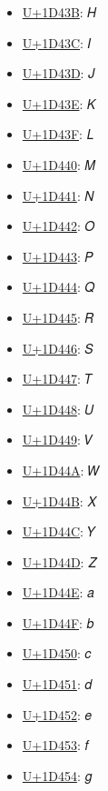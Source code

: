 \begin{itemize}
	\item \href{https://decodeunicode.org/en/u+1D43B}{U+1D43B}: 𝐻
	\item \href{https://decodeunicode.org/en/u+1D43C}{U+1D43C}: 𝐼
	\item \href{https://decodeunicode.org/en/u+1D43D}{U+1D43D}: 𝐽
	\item \href{https://decodeunicode.org/en/u+1D43E}{U+1D43E}: 𝐾
	\item \href{https://decodeunicode.org/en/u+1D43F}{U+1D43F}: 𝐿
	\item \href{https://decodeunicode.org/en/u+1D440}{U+1D440}: 𝑀
	\item \href{https://decodeunicode.org/en/u+1D441}{U+1D441}: 𝑁
	\item \href{https://decodeunicode.org/en/u+1D442}{U+1D442}: 𝑂
	\item \href{https://decodeunicode.org/en/u+1D443}{U+1D443}: 𝑃
	\item \href{https://decodeunicode.org/en/u+1D444}{U+1D444}: 𝑄
	\item \href{https://decodeunicode.org/en/u+1D445}{U+1D445}: 𝑅
	\item \href{https://decodeunicode.org/en/u+1D446}{U+1D446}: 𝑆
	\item \href{https://decodeunicode.org/en/u+1D447}{U+1D447}: 𝑇
	\item \href{https://decodeunicode.org/en/u+1D448}{U+1D448}: 𝑈
	\item \href{https://decodeunicode.org/en/u+1D449}{U+1D449}: 𝑉
	\item \href{https://decodeunicode.org/en/u+1D44A}{U+1D44A}: 𝑊
	\item \href{https://decodeunicode.org/en/u+1D44B}{U+1D44B}: 𝑋
	\item \href{https://decodeunicode.org/en/u+1D44C}{U+1D44C}: 𝑌
	\item \href{https://decodeunicode.org/en/u+1D44D}{U+1D44D}: 𝑍
	\item \href{https://decodeunicode.org/en/u+1D44E}{U+1D44E}: 𝑎
	\item \href{https://decodeunicode.org/en/u+1D44F}{U+1D44F}: 𝑏
	\item \href{https://decodeunicode.org/en/u+1D450}{U+1D450}: 𝑐
	\item \href{https://decodeunicode.org/en/u+1D451}{U+1D451}: 𝑑
	\item \href{https://decodeunicode.org/en/u+1D452}{U+1D452}: 𝑒
	\item \href{https://decodeunicode.org/en/u+1D453}{U+1D453}: 𝑓
	\item \href{https://decodeunicode.org/en/u+1D454}{U+1D454}: 𝑔

\end{itemize}
